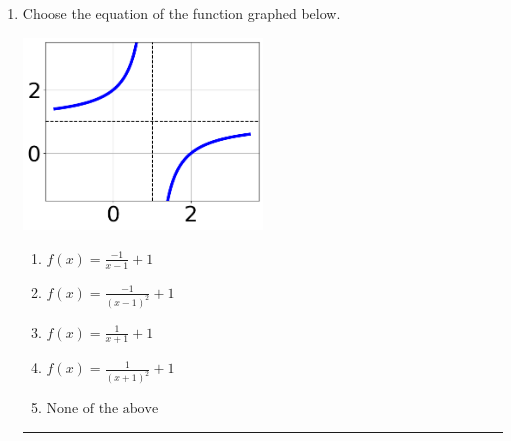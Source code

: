 \documentclass[14pt]{extbook}
\newcommand{\litem}[1]{\item#1\hspace*{-1cm}\rule{\textwidth}{0.4pt}}
\begin{document}
\begin{enumerate}
{\begin{enumerate}[label=\Alph*.]
\end{enumerate} }
\litem{
Choose the equation of the function graphed below.
\begin{center}
    \includegraphics[width=0.5\textwidth]{../Figures/rationalGraphToEquationCopyC.png}
\end{center}
\begin{enumerate}[label=\Alph*.]
\item \( f(x) = \frac{-1}{x - 1} + 1 \)
\item \( f(x) = \frac{-1}{(x - 1)^2} + 1 \)
\item \( f(x) = \frac{1}{x + 1} + 1 \)
\item \( f(x) = \frac{1}{(x + 1)^2} + 1 \)
\item \( \text{None of the above} \)

\end{enumerate} }
\end{enumerate}
\end{document}

